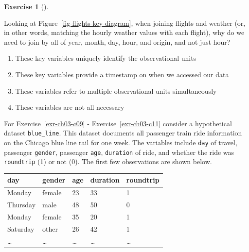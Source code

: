 \documentclass[
  letterpaper,
  DIV=11,
  numbers=noendperiod]{scrreprt}
\providecommand{\tightlist}{%
  \setlength{\itemsep}{0pt}\setlength{\parskip}{0pt}}\usepackage{longtable,booktabs,array}
\theoremstyle{definition}
\newtheorem{exercise}{Exercise}[chapter]
\theoremstyle{remark}
\begin{document}
\begin{exercise}[]\protect\hypertarget{exr-ch03-c08}{}\label{exr-ch03-c08}

Looking at Figure~\ref{fig-flights-key-diagram}, when joining flights
and weather (or, in other words, matching the hourly weather values with
each flight), why do we need to join by all of year, month, day, hour,
and origin, and not just hour?

\begin{enumerate}
\def\labelenumi{\alph{enumi})}
\tightlist
\item
  These key variables uniquely identify the observational units
\item
  These key variables provide a timestamp on when we accessed our data
\item
  These variables refer to multiple observational units simultaneously
\item
  These variables are not all necessary
\end{enumerate}

\end{exercise}

For Exercise~\ref{exr-ch03-c09} - Exercise~\ref{exr-ch03-c11} consider a
hypothetical dataset \texttt{blue\_line}. This dataset documents all
passenger train ride information on the Chicago blue line rail for one
week. The variables include \texttt{day} of travel, passenger
\texttt{gender}, passenger \texttt{age}, \texttt{duration} of ride, and
whether the ride was \texttt{roundtrip} (1) or not (0). The first few
observations are shown below.

\begin{longtable}[]{@{}lllll@{}}
\toprule\noalign{}
day & gender & age & duration & roundtrip \\
\midrule\noalign{}
\endhead
\bottomrule\noalign{}
\endlastfoot
Monday & female & 23 & 33 & 1 \\
Thursday & male & 48 & 50 & 0 \\
Monday & female & 35 & 20 & 1 \\
Saturday & other & 26 & 42 & 1 \\
\ldots{} & \ldots{} & \ldots{} & \ldots{} & \ldots{} \\
\end{longtable}
\end{document}
